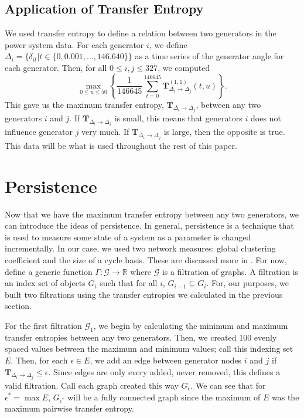 \documentclass{article}
\theoremstyle{definition}
\newcommand{\Tb}{\mathbf{T}}
\newcommand{\R}{\mathbb{R}}
\newcommand{\G}{\mathcal{G} }
\newcommand{\func}[3]{#1: #2 \to #3}
\begin{document}
\subsection{Application of Transfer Entropy}
We used transfer entropy to define a relation between two generators in the power system data. For each generator $i$, we define $\Delta_i = \{\delta_{it} | t \in \{0, 0.001, \ldots, 146.640\}\}$ as a time series of the generator angle for each generator. Then, for all $0 \leq i,j \leq 327$, we computed 
\[\max_{0\leq u \leq 50}\left\{\frac{1}{146645}\sum_{t=0}^{146645}\Tb_{\Delta_i \to \Delta_j}^{(1,1)}(t,u)\right\}.\]
This gave us the maximum transfer entropy, $\Tb_{\Delta_i \to \Delta_j}$, between any two generators $i$ and $j$. If $\Tb_{\Delta_i \to \Delta_j}$ is small, this means that generators $i$ does not influence generator $j$ very much. If $\Tb_{\Delta_i \to \Delta_j}$ is large, then the opposite is true. This data will be what is used throughout the rest of this paper. 
\section{Persistence}
Now that we have the maximum transfer entropy between any two generators, we can introduce the ideas of persistence. In general, persistence is a technique that is used to measure some state of a system as a parameter is changed incrementally. In our case, we used two network measures: global clustering coefficient and the size of a cycle basis. These are discussed more in . For now, define a generic function $\func{\Gamma}{\G}{\R}$ where $\G$ is a filtration of graphs. A filtration is an index set of objects $G_i$ such that for all $i$, $G_{i-1} \subseteq G_i$. For, our purposes, we built two filtrations using the transfer entropies we calculated in the previous section. 

For the first filtration $\G_1$, we begin by calculating the minimum and maximum transfer entropies between any two generators. Then, we created 100 evenly spaced values between the maximum and minimum values; call this indexing set $E$. Then, for each $\epsilon \in E$, we add an edge between generator nodes $i$ and $j$ if $\Tb_{\Delta_i \to \Delta_j} \leq \epsilon$. Since edges are only every added, never removed, this defines a valid filtration. Call each graph created this way $G_\epsilon$. We can see that for $\epsilon^* = \max E$, $G_{\epsilon^*}$ will be a fully connected graph since the maximum of $E$ was the maximum pairwise transfer entropy.
\end{document}
